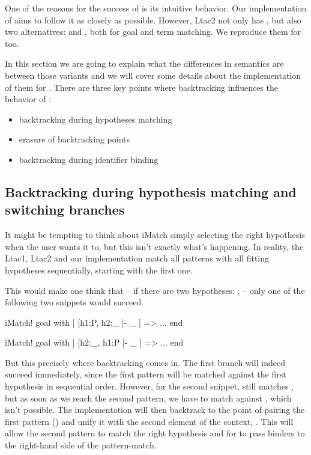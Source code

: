 One of the reasons for the success of  is its intuitive behavior.
Our implementation of  aims to follow it as closely as possible.
However, Ltac2 not only has , but also two alternatives:  and , both for goal and term matching.
We reproduce them for  too.

In this section we are going to explain what the differences in semantics are between those variants and we will cover some details about the implementation of them for .
There are three key points where backtracking influences the behavior of :

\begin{minipage}{1.0\linewidth}
\begin{itemize}
\item backtracking during hypotheses matching
\item erasure of backtracking points
\item backtracking during identifier binding
\end{itemize}
\end{minipage}

\subsection{Backtracking during hypothesis matching and switching branches}

It might be tempting to think about iMatch simply selecting the right hypothesis when the user wants it to, but this isn't exactly what's happening.
In reality, the Ltac1, Ltac2 and our implementation match all patterns with all fitting hypotheses sequentially, starting with the first one.

This would make one think that -- if there are two hypotheses: ,  -- only one of the following two snippets would succeed.
\begin{coq}
  iMatch! goal with
  | [h1:P, h2:_ |- _ ] => ...
  end
\end{coq}
\begin{coq}
  iMatch! goal with
  | [h2:_, h1:P |- _ ] => ...
  end
\end{coq}

But this precisely where backtracking comes in.
The first branch will indeed succeed immediately, since the first pattern will be matched against the first hypothesis in sequential order.
However, for the second snippet,  still matches \coqe{_}, but as soon as we reach the second pattern, we have to match  against , which isn't possible.
The implementation will then backtrack to the point of pairing the first pattern (\coqe{_}) and unify it with the second element of the context, .
This will allow the second pattern to match the right hypothesis and for  to pass binders to the right-hand side of the pattern-match.

